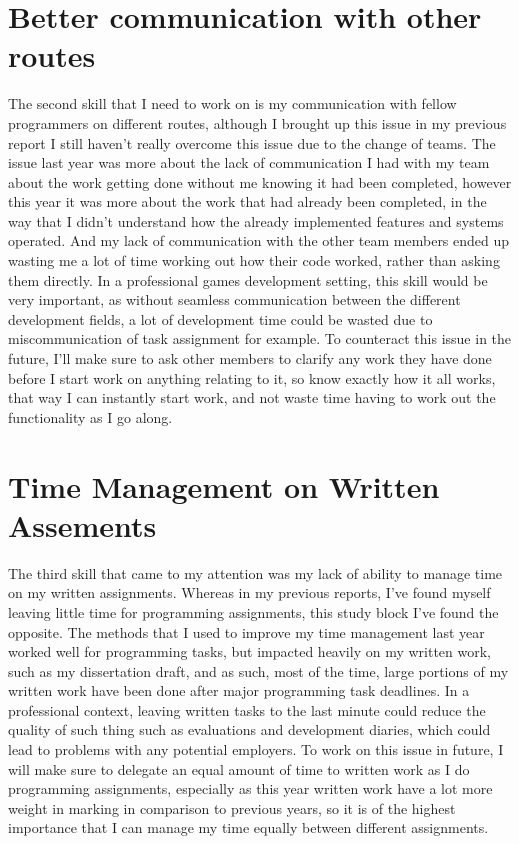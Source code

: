 \documentclass{scrartcl}
\begin{document}
\section{Better communication with other routes}
The second skill that I need to work on is my communication with fellow programmers on different routes, although I brought up this issue in my previous report I still haven't really overcome this issue due to the change of teams. The issue last year was more about the lack of communication I had with my team about the work getting done without me knowing it had been completed, however this year it was more about the work that had already been completed, in the way that I didn't understand how the already implemented features and systems operated. And my lack of communication with the other team members ended up wasting me a lot of time working out how their code worked, rather than asking them directly. In a professional games development setting, this skill would be very important, as without seamless communication between the different development fields, a lot of development time could be wasted due to miscommunication of task assignment for example. To counteract this issue in the future, I'll make sure to ask other members to clarify any work they have done before I start work on  anything relating to it, so know exactly how it all works, that way I can instantly start work, and not waste time having to work out the functionality as I go along. 


\section{Time Management on Written Assements}
The third skill that came to my attention was my lack of ability to manage time on my written assignments. Whereas in my previous reports, I've found myself leaving little time for programming assignments, this study block I've found the opposite. The methods that I used to improve my time management last year worked well for programming tasks, but impacted heavily on my written work, such as my dissertation draft, and as such, most of the time, large portions of my written work have been done after major programming task deadlines. In a professional context, leaving written tasks to the last minute could reduce the quality of such thing such as evaluations and development diaries, which could lead to problems with any potential employers. To work on this issue in future, I will make sure to delegate an equal amount of time to written work as I do programming assignments, especially as this year written work have a lot more weight in marking in comparison to previous years, so it is of the highest importance that I can manage my time equally between different assignments. 
\end{document}
